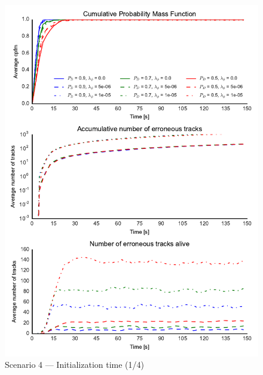 \begin{figure}
\centering
\includegraphics{Figures/plots/Scenario4_Init-Time(1-4).pdf}
\caption{Scenario 4 --- Initialization time (1/4)}\label{fig:init4_time_1-4}
\end{figure}

